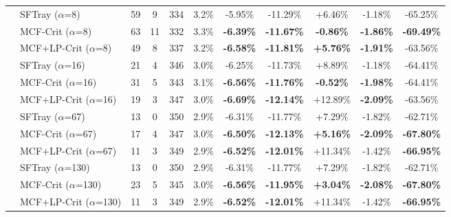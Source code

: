\begin{table}[t]
{\begin{tabular}{ll|cccc|ccc|cc}
\addlinespace[0.5em]

 & SFTray ($\alpha$=8) & 59 & 9 & 334 & 3.2\% & -5.95\% & -11.29\% & +6.46\% & -1.18\% & -65.25\% \\

 & MCF-Crit ($\alpha$=8) & 63 & 11 & 332 & 3.3\% & \textbf{-6.39\%} & \textbf{-11.67\%} & \textbf{-0.86\%} & \textbf{-1.86\%} & \textbf{-69.49\%} \\

 & MCF+LP-Crit ($\alpha$=8) & 49 & 8 & 337 & 3.2\% & \textbf{-6.58\%} & \textbf{-11.81\%} & \textbf{+5.76\%} & \textbf{-1.91\%} & -63.56\% \\

\addlinespace[0.5em]

 & SFTray ($\alpha$=16) & 21 & 4 & 346 & 3.0\% & -6.25\% & -11.73\% & +8.89\% & -1.18\% & -64.41\% \\

 & MCF-Crit ($\alpha$=16) & 31 & 5 & 343 & 3.1\% & \textbf{-6.56\%} & \textbf{-11.76\%} & \textbf{-0.52\%} & \textbf{-1.98\%} & -64.41\% \\

 & MCF+LP-Crit ($\alpha$=16) & 19 & 3 & 347 & 3.0\% & \textbf{-6.69\%} & \textbf{-12.14\%} & +12.89\% & \textbf{-2.09\%} & -63.56\% \\

\addlinespace[0.5em]

 & SFTray ($\alpha$=67) & 13 & 0 & 350 & 2.9\% & -6.31\% & -11.77\% & +7.29\% & -1.82\% & -62.71\% \\

 & MCF-Crit ($\alpha$=67) & 17 & 4 & 347 & 3.0\% & \textbf{-6.50\%} & \textbf{-12.13\%} & \textbf{+5.16\%} & \textbf{-2.09\%} & \textbf{-67.80\%} \\

 & MCF+LP-Crit ($\alpha$=67) & 11 & 3 & 349 & 2.9\% & \textbf{-6.52\%} & \textbf{-12.01\%} & +11.34\% & -1.42\% & \textbf{-66.95\%} \\

\addlinespace[0.5em]

 & SFTray ($\alpha$=130) & 13 & 0 & 350 & 2.9\% & -6.31\% & -11.77\% & +7.29\% & -1.82\% & -62.71\% \\

 & MCF-Crit ($\alpha$=130) & 23 & 5 & 345 & 3.0\% & \textbf{-6.56\%} & \textbf{-11.95\%} & \textbf{+3.04\%} & \textbf{-2.08\%} & \textbf{-67.80\%} \\

 & MCF+LP-Crit ($\alpha$=130) & 11 & 3 & 349 & 2.9\% & \textbf{-6.52\%} & \textbf{-12.01\%} & +11.34\% & -1.42\% & \textbf{-66.95\%} \\


\end{tabular}}
\end{table}
